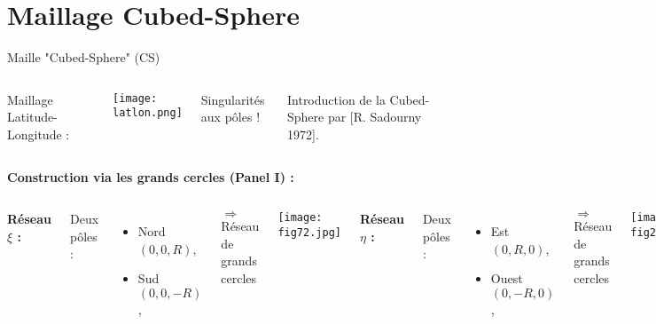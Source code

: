 \documentclass[11pt]{beamer}
\begin{document}
\section{Maillage Cubed-Sphere}
\begin{frame}{Maille "Cubed-Sphere" (CS)}

\begin{columns}
Maillage Latitude-Longitude :

\begin{center}
\texttt{[image: latlon.png]}
\end{center}


\begin{alertblock}{}
Singularités aux pôles !
\end{alertblock}

\pause
Introduction de la Cubed-Sphere par [R. Sadourny 1972].
\end{columns}

\end{frame}

\begin{frame}

\textbf{Construction via les grands cercles (Panel I) :}

\begin{columns}

\vspace{0.8cm}
\textbf{Réseau $\xi$ :}

Deux pôles :
\begin{itemize}
\item Nord $(0,0,R)$,
\item Sud $(0,0,-R)$,
\end{itemize}

$\Rightarrow$ Réseau de grands cercles

\texttt{[image: fig72.jpg]}

\pause
{}

\textbf{Réseau $\eta$ :}

Deux pôles :
\begin{itemize}
\item Est $(0,R,0)$,
\item Ouest $(0,-R,0)$,
\end{itemize}

$\Rightarrow$ Réseau de grands cercles

\texttt{[image: fig22.jpg]}

\end{columns}
\end{frame}
\end{document}
